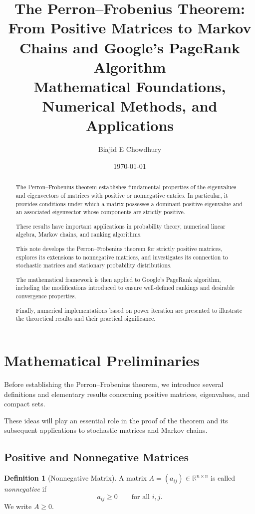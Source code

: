 \documentclass[11pt,a4paper]{article}
\title{
    \textbf{The Perron--Frobenius Theorem:
    From Positive Matrices to Markov Chains
    and Google's PageRank Algorithm}\\[0.3cm]
    \large Mathematical Foundations,
    Numerical Methods, and Applications
}
\author{Biajid E Chowdhury}
\date{\today}
\theoremstyle{definition}
\newtheorem{definition}[theorem]{Definition}
\theoremstyle{remark}
\begin{document}
\maketitle

\begin{abstract}

The Perron--Frobenius theorem establishes
fundamental properties of the eigenvalues
and eigenvectors of matrices with positive
or nonnegative entries.
In particular, it provides conditions under
which a matrix possesses a dominant positive
eigenvalue and an associated eigenvector
whose components are strictly positive.

These results have important applications
in probability theory, numerical linear
algebra, Markov chains, and ranking algorithms.

This note develops the Perron--Frobenius
theorem for strictly positive matrices,
explores its extensions to nonnegative
matrices, and investigates its connection
to stochastic matrices and stationary
probability distributions.

The mathematical framework is then applied
to Google's PageRank algorithm, including
the modifications introduced to ensure
well-defined rankings and desirable
convergence properties.

Finally, numerical implementations based
on power iteration are presented to
illustrate the theoretical results and
their practical significance.

\end{abstract}

\tableofcontents
\newpage
\section{Mathematical Preliminaries}

Before establishing the Perron--Frobenius
theorem, we introduce several definitions
and elementary results concerning positive
matrices, eigenvalues, and compact sets.

These ideas will play an essential role
in the proof of the theorem and its
subsequent applications to stochastic
matrices and Markov chains.


\subsection{Positive and Nonnegative Matrices}

\begin{definition}[Nonnegative Matrix]
A matrix $A=(a_{ij})\in\mathbb{R}^{n\times n}$
is called \emph{nonnegative} if
\[
a_{ij}\geq0
\qquad
\text{for all }i,j.
\]
We write $A\geq0$.
\end{definition}
\end{document}
